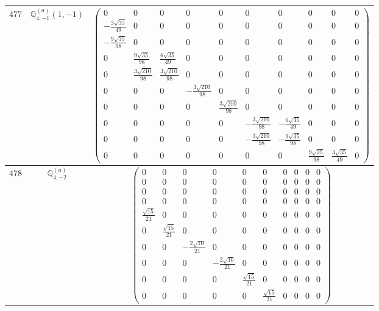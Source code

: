 \documentclass[fleqn,8pt,landscape]{jsarticle}
\begin{document}
\begin{center}
\begin{longtable}{ccc}
$ 477 $ & $ \mathbb{Q}_{4,-1}^{(a)}(1,-1) $ & $ \begin{pmatrix} 0 & 0 & 0 & 0 & 0 & 0 & 0 & 0 & 0 & 0 \\ - \frac{3 \sqrt{35}}{49} & 0 & 0 & 0 & 0 & 0 & 0 & 0 & 0 & 0 \\ - \frac{9 \sqrt{35}}{98} & 0 & 0 & 0 & 0 & 0 & 0 & 0 & 0 & 0 \\ 0 & \frac{9 \sqrt{35}}{98} & \frac{6 \sqrt{35}}{49} & 0 & 0 & 0 & 0 & 0 & 0 & 0 \\ 0 & \frac{3 \sqrt{210}}{98} & \frac{3 \sqrt{210}}{98} & 0 & 0 & 0 & 0 & 0 & 0 & 0 \\ 0 & 0 & 0 & - \frac{3 \sqrt{210}}{98} & 0 & 0 & 0 & 0 & 0 & 0 \\ 0 & 0 & 0 & 0 & \frac{3 \sqrt{210}}{98} & 0 & 0 & 0 & 0 & 0 \\ 0 & 0 & 0 & 0 & 0 & - \frac{3 \sqrt{210}}{98} & - \frac{6 \sqrt{35}}{49} & 0 & 0 & 0 \\ 0 & 0 & 0 & 0 & 0 & - \frac{3 \sqrt{210}}{98} & - \frac{9 \sqrt{35}}{98} & 0 & 0 & 0 \\ 0 & 0 & 0 & 0 & 0 & 0 & 0 & \frac{9 \sqrt{35}}{98} & \frac{3 \sqrt{35}}{49} & 0 \end{pmatrix} $ \\ \hline
$ 478 $ & $ \mathbb{Q}_{4,-2}^{(a)} $ & $ \begin{pmatrix} 0 & 0 & 0 & 0 & 0 & 0 & 0 & 0 & 0 & 0 \\ 0 & 0 & 0 & 0 & 0 & 0 & 0 & 0 & 0 & 0 \\ 0 & 0 & 0 & 0 & 0 & 0 & 0 & 0 & 0 & 0 \\ 0 & 0 & 0 & 0 & 0 & 0 & 0 & 0 & 0 & 0 \\ \frac{\sqrt{15}}{21} & 0 & 0 & 0 & 0 & 0 & 0 & 0 & 0 & 0 \\ 0 & \frac{\sqrt{15}}{21} & 0 & 0 & 0 & 0 & 0 & 0 & 0 & 0 \\ 0 & 0 & - \frac{2 \sqrt{10}}{21} & 0 & 0 & 0 & 0 & 0 & 0 & 0 \\ 0 & 0 & 0 & - \frac{2 \sqrt{10}}{21} & 0 & 0 & 0 & 0 & 0 & 0 \\ 0 & 0 & 0 & 0 & \frac{\sqrt{15}}{21} & 0 & 0 & 0 & 0 & 0 \\ 0 & 0 & 0 & 0 & 0 & \frac{\sqrt{15}}{21} & 0 & 0 & 0 & 0 \end{pmatrix} $ \\ \hline

\end{longtable}
\end{center}
\end{document}
